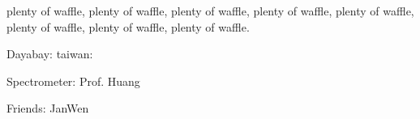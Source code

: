 \begin{acknowledgements}
plenty of waffle, plenty of waffle, plenty of waffle, plenty of waffle,
plenty of waffle, plenty of waffle, plenty of waffle, plenty of waffle.















Dayabay:
    taiwan:
        





Spectrometer:
Prof. Huang

Friends:
JanWen

\end{acknowledgements}


